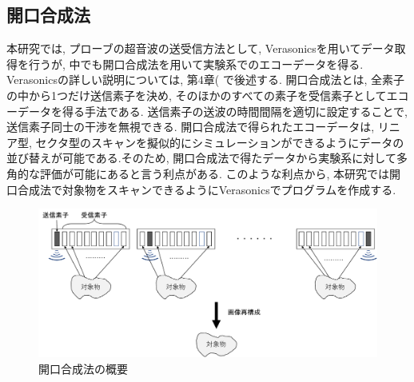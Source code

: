 \subsection{開口合成法}
本研究では, プローブの超音波の送受信方法として, Verasonicsを用いてデータ取得を行うが, 中でも開口合成法を用いて実験系でのエコーデータを得る. Verasonicsの詳しい説明については, 第4章(%
で後述する. 開口合成法とは, 全素子の中から1つだけ送信素子を決め, そのほかのすべての素子を受信素子としてエコーデータを得る手法である. 送信素子の送波の時間間隔を適切に設定することで, 送信素子同士の干渉を無視できる. 開口合成法で得られたエコーデータは, リニア型, セクタ型のスキャンを擬似的にシミュレーションができるようにデータの並び替えが可能である.そのため, 開口合成法で得たデータから実験系に対して多角的な評価が可能にあると言う利点がある. このような利点から, 本研究では開口合成法で対象物をスキャンできるようにVerasonicsでプログラムを作成する. 
\begin{figure}[H]
  \begin{center}
    \includegraphics[width=140mm]{fig/kaikougousei.pdf}
  \end{center}
  \caption{開口合成法の概要}
\end{figure}
